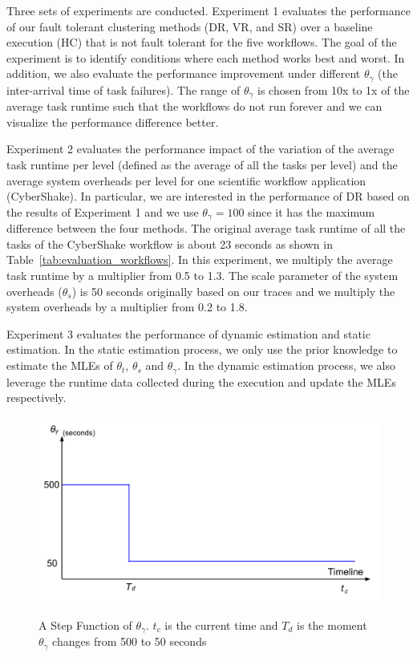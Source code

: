 \documentclass{IOS-Book-Article}
\begin{document}
Three sets of experiments are conducted. Experiment 1 evaluates the performance of our fault tolerant clustering methods (DR, VR, and SR) over a baseline execution (HC) that is not fault tolerant for the five workflows. The goal of the experiment is to identify conditions where each method works best and worst. In addition, we also evaluate the performance improvement under different $\theta_{\gamma}$ (the inter-arrival time of task failures). The range of $\theta_{\gamma}$ is chosen from 10x to 1x of the average task runtime such that the workflows do not run forever and we can visualize the performance difference better. 


Experiment 2 evaluates the performance impact of the variation of the average task runtime per level (defined as the average of all the tasks per level) and the average system overheads per level for one scientific workflow application (CyberShake). In particular, we are interested in the performance of DR based on the results of Experiment 1 and we use $\theta_{\gamma}=100$ since it has the maximum difference between the four methods. The original average task runtime of all the tasks of the CyberShake workflow is about 23 seconds as shown in Table~\ref{tab:evaluation_workflows}. In this experiment, we multiply the average task runtime by a multiplier from 0.5 to 1.3. The scale parameter of the system overheads ($\theta_{s}$) is 50 seconds originally based on our traces and we multiply the system overheads by a multiplier from 0.2 to 1.8.  

Experiment 3 evaluates the performance of dynamic estimation and static estimation. In the static estimation process, we only use the prior knowledge to estimate the MLEs of $\theta_t$, $\theta_s$ and $\theta_{\gamma}$. In the dynamic estimation process, we also leverage the runtime data collected during the execution and update the MLEs respectively. 

\begin{figure}[htb]
	\centering
	\includegraphics[width=0.8\linewidth]{step_signal.pdf} \\
	\caption{A Step Function of $\theta_{\gamma}$. $t_c$ is the current time and $T_d$ is the moment $\theta_{\gamma}$ changes from 500 to 50 seconds}
	\label{fig:evaluation_step_signal}
\end{figure}
\end{document}
